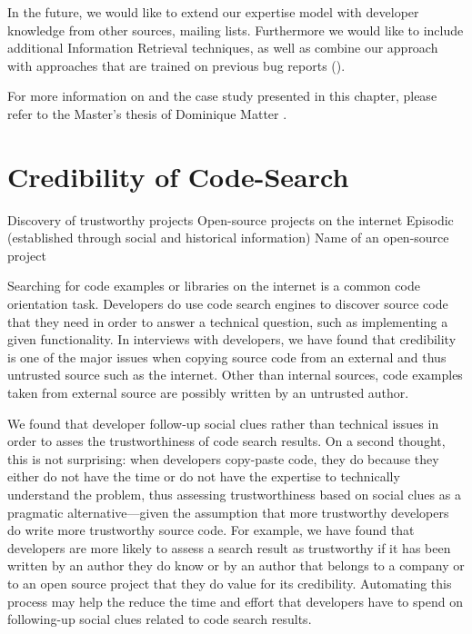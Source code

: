 \documentclass[10pt]{book}
\begin{document}
In the future, we would like to extend our expertise model with developer knowledge from other sources, \eg mailing lists. Furthermore we would like to include additional Information Retrieval techniques, as well as combine our approach with approaches that are trained on previous bug reports (\eg \cite{Anvi06a, Canf05a, Cubr04b, Lucc02a}).

For more information on \DEVLECT and the case study presented in this chapter, please refer to the Master's thesis of Dominique Matter \cite{Matt09a}.



\chapter{Credibility of Code-Search}
\label{the chapter on codesearch}

\infobox
	{Discovery of trustworthy projects}
	{Open-source projects on the internet}
	{Episodic (established through social and historical information)}
	{Name of an open-source project}

Searching for code examples or libraries on the internet is a common code orientation task. Developers do use code search engines to discover source code that they need in order to answer a technical question, such as implementing a given functionality. In interviews with developers, we have found that credibility is one of the major issues when copying source code from an external and thus untrusted source such as the internet. Other than internal sources, code examples taken from external source are possibly written by an untrusted author.

We found that developer follow-up social clues rather than technical issues in order to asses the trustworthiness of code search results. On a second thought, this is not surprising: when developers copy-paste code, they do because they either do not have the time or do not have the expertise to technically understand the problem, thus assessing trustworthiness based on social clues as a pragmatic alternative---given the assumption that more trustworthy developers do write more trustworthy source code. For example, we have found that developers are more likely to assess a search result as trustworthy if it has been written by an author they do know or by an author that belongs to a company or to an open source project that they do value for its credibility. Automating this process may help the reduce the time and effort that developers have to spend on following-up social clues related to code search results.
\end{document}
